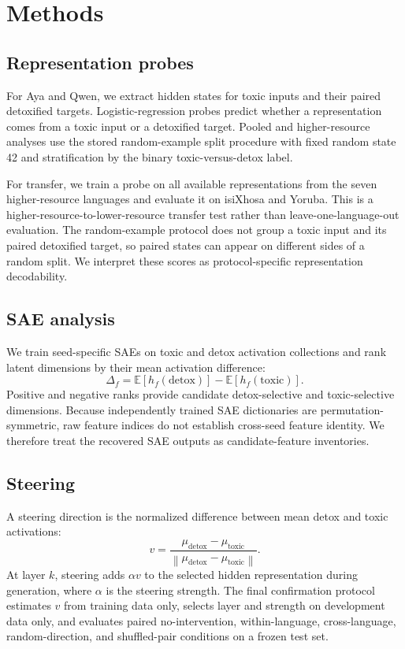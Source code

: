 \section{Methods}

\subsection{Representation probes}

For Aya and Qwen, we extract hidden states for toxic inputs and their paired
detoxified targets. Logistic-regression probes predict whether a representation comes
from a toxic input or a detoxified target. Pooled and higher-resource analyses use the
stored random-example split procedure with fixed random state 42 and stratification by
the binary toxic-versus-detox label.

For transfer, we train a probe on all available representations from the seven
higher-resource languages and evaluate it on isiXhosa and Yoruba. This is a
higher-resource-to-lower-resource transfer test rather than leave-one-language-out
evaluation. The random-example protocol does not group a toxic input and its paired
detoxified target, so paired states can appear on different sides of a random split.
We interpret these scores as protocol-specific representation decodability.

\subsection{SAE analysis}

We train seed-specific SAEs on toxic and detox activation collections and rank latent
dimensions by their mean activation difference:
\[
\Delta_f =
\mathbb{E}[h_f(\mathrm{detox})] -
\mathbb{E}[h_f(\mathrm{toxic})].
\]
Positive and negative ranks provide candidate detox-selective and toxic-selective
dimensions. Because independently trained SAE dictionaries are permutation-symmetric,
raw feature indices do not establish cross-seed feature identity. We therefore treat
the recovered SAE outputs as candidate-feature inventories.

\subsection{Steering}

A steering direction is the normalized difference between mean detox and toxic
activations:
\[
v = \frac{\mu_{\mathrm{detox}}-\mu_{\mathrm{toxic}}}
{\left\|\mu_{\mathrm{detox}}-\mu_{\mathrm{toxic}}\right\|}.
\]
At layer \(k\), steering adds \(\alpha v\) to the selected hidden representation
during generation, where \(\alpha\) is the steering strength. The final confirmation
protocol estimates \(v\) from training data only, selects layer and strength on
development data only, and evaluates paired no-intervention, within-language,
cross-language, random-direction, and shuffled-pair conditions on a frozen test set.

